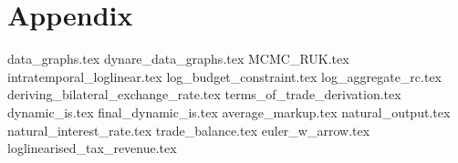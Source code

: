 \section{Appendix}
\appendix 
{data_graphs.tex}
{dynare_data_graphs.tex}
{MCMC_RUK.tex}
\renewcommand{\theequation}{A.\arabic{equation}}
{intratemporal_loglinear.tex}
{log_budget_constraint.tex}
{log_aggregate_rc.tex}
{deriving_bilateral_exchange_rate.tex}
{terms_of_trade_derivation.tex}
{dynamic_is.tex}
{final_dynamic_is.tex}
{average_markup.tex}
{natural_output.tex}
{natural_interest_rate.tex}
{trade_balance.tex}
{euler_w_arrow.tex}
{loglinearised_tax_revenue.tex}
